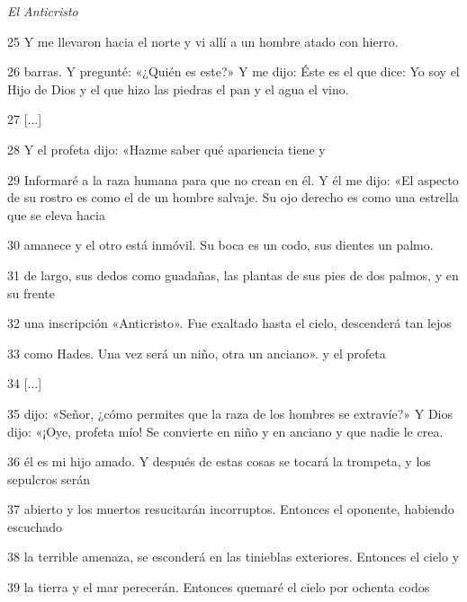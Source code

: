 \par \textit{El Anticristo}

\par 25 Y me llevaron hacia el norte y vi allí a un hombre atado con hierro.

\par 26 barras. Y pregunté: «¿Quién es este?» Y me dijo: Éste es el que dice: Yo soy el Hijo de Dios y el que hizo las piedras el pan y el agua el vino.

\par 27 [...]

\par 28 Y el profeta dijo: «Hazme saber qué apariencia tiene y

\par 29 Informaré a la raza humana para que no crean en él. Y él me dijo: «El aspecto de su rostro es como el de un hombre salvaje. Su ojo derecho es como una estrella que se eleva hacia

\par 30 amanece y el otro está inmóvil. Su boca es un codo, sus dientes un palmo.

\par 31 de largo, sus dedos como guadañas, las plantas de sus pies de dos palmos, y en su frente

\par 32 una inscripción «Anticristo». Fue exaltado hasta el cielo, descenderá tan lejos

\par 33 como Hades. Una vez será un niño, otra un anciano». y el profeta

\par 34 [...]

\par 35 dijo: «Señor, ¿cómo permites que la raza de los hombres se extravíe?» Y Dios dijo: «¡Oye, profeta mío! Se convierte en niño y en anciano y que nadie le crea.

\par 36 él es mi hijo amado. Y después de estas cosas se tocará la trompeta, y los sepulcros serán

\par 37 abierto y los muertos resucitarán incorruptos. Entonces el oponente, habiendo escuchado

\par 38 la terrible amenaza, se esconderá en las tinieblas exteriores. Entonces el cielo y

\par 39 la tierra y el mar perecerán. Entonces quemaré el cielo por ochenta codos

